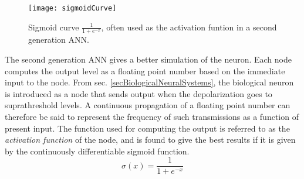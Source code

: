 \begin{figure}[hbt!p]
	\centering
	\texttt{[image: sigmoidCurve]}
	\caption[The sigmoid curve that is often used to compute the output of a node in a second generation ANN]{Sigmoid curve $\frac{1}{1+e^{-x}}$, often used as the activation funtion in a second generation ANN.}
	\label{figSigmoidCurve}
\end{figure}

	The second generation ANN gives a better simulation of the neuron. %
	Each node computes the output level as a floating point number based on the immediate input to the node.
	From sec. \ref{secBiologicalNeuralSystems}, the biological neuron is introduced as a node that sends output when the depolarization goes to suprathreshold levels.
	A continuous propagation of a floating point number can therefore be said to represent the frequency of such transmissions as a function of present input.
	The function used for computing the output is referred to as the \emph{activation function} of the node, and is found to give the best results if it is given by the continuously differentiable sigmoid function\cite{HaykinANNbok}.
\begin{equation}
	\sigma(x)=\frac{1}{1+e^{-x}}   %
\end{equation}

